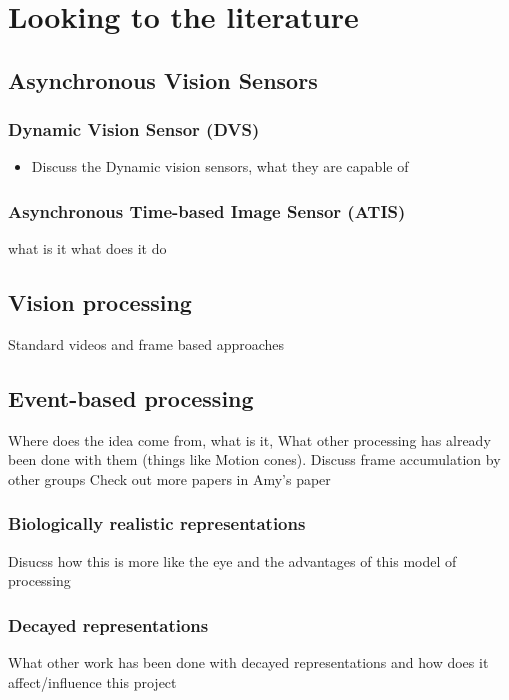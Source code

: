 \chapter{Looking to the literature}


\section{Asynchronous Vision Sensors}  %
\subsection{Dynamic Vision Sensor (DVS)}
\begin{itemize}
    \item Discuss the Dynamic vision sensors, what they are capable of
\end{itemize}

\subsection{Asynchronous Time-based Image Sensor (ATIS)}
what is it what does it do


\section{Vision processing}   %
Standard videos and frame based approaches

\section{Event-based processing}     %
Where does the idea come from, what is it, 
What other processing has already been done with them (things like Motion cones).
Discuss frame accumulation by other groups
Check out more papers in Amy's paper

\subsection{Biologically realistic representations}
Disucss how this is more like the eye and the advantages of this model of processing

\subsection{Decayed representations}  %
What other work has been done with decayed representations and how does it affect/influence this project

